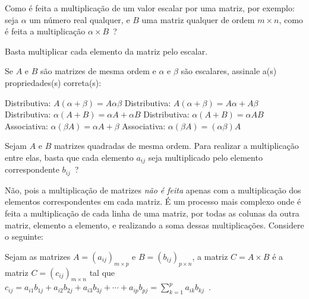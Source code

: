 \documentclass[pdftex, brazil, 12pt, oneside, addpoints, answers]{exam}
\newcommand{\vf}[1][{}]{%
  \fillin[#1][0.25in]%
}
\begin{document}
\begin{questions}

\question
Como é feita a multiplicação de um valor escalar por uma matriz, por exemplo: seja $\alpha$ um
número real qualquer, e $B$ uma matriz qualquer de ordem $m \times n$, como é feita a multiplicação $\alpha \times B$\ ?
\begin{solutionorlines}[0.50in]
  Basta multiplicar cada elemento da matriz pelo escalar.
\end{solutionorlines}

\question
Se $A$ e $B$ são matrizes de mesma ordem e $\alpha$ e $\beta$ são escalares, assinale
a(s) propriedades(s) correta(s):
\begin{checkboxes}
  \choice Distributiva: $A(\alpha + \beta) = A \alpha \beta$
  \CorrectChoice Distributiva: $A(\alpha + \beta) = A \alpha + A \beta$
  \CorrectChoice Distributiva: $\alpha (A + B) = \alpha A + \alpha B$
  \choice Distributiva: $\alpha (A + B) = \alpha AB$
  \choice Associativa: $\alpha(\beta A) = \alpha A + \beta$
  \CorrectChoice Associativa: $\alpha(\beta A) = (\alpha \beta)A$
\end{checkboxes}

\question
Sejam $A$ e $B$ matrizes quadradas de mesma ordem. Para realizar a multiplicação entre elas,
basta que cada elemento $a_{ij}$ seja multiplicado pelo elemento correspondente $b_{ij}$\ ?
\begin{solutionorlines}[0.50in]
  Não, pois a multiplicação de matrizes \emph{não é feita} apenas com a multiplicação
  dos elementos correspondentes em cada matriz. É um processo mais complexo onde é feita a
  multiplicação de cada linha de uma matriz, por todas as colunas da outra matriz, elemento a
  elemento, e realizando a soma dessas multiplicações. Considere o seguinte:

  Sejam as matrizes $A = (a_{ij})_{m \times p}$ e $B = (b_{ij})_{p \times n}$, a matriz $C = A \times B$
  é a matriz $C = (c_{ij})_{m \times n}$ tal que $c_{ij} = a_{i1}b_{1j} + a_{i2}b_{2j} + a_{i3}b_{3j} + \cdots + a_{ip}b_{pj} = \sum_{k=1}^{p} a_{ik}b_{kj}$\ .


\end{solutionorlines}
\end{questions}
\end{document}
